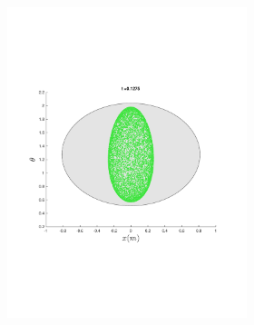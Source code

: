 \begin{figure}
{\begin{subfigure}{0.5\textwidth}
\begin{subfigure}[b]{0.5\textwidth}
        \includegraphics[trim={1cm 7cm 1cm 7cm},
        width=\textwidth]{figures/method/FunnelSimOverlaid18funnel-1y-theta}
      \end{subfigure}%
      \begin{subfigure}[b]{0.5\textwidth}

\end{subfigure}
\end{subfigure}}
\end{figure}
